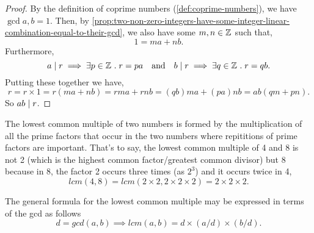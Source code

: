\documentclass[../MathsNotesBase.tex]{subfiles}
\begin{document}
{		
		\bigskip
		\begin{proof}
			By the definition of coprime numbers (\ref{def:coprime-numbers}), we have ${ \operatorname{gcd} a,b = 1 }$. Then, by \autoref{prop:two-non-zero-integers-have-some-integer-linear-combination-equal-to-their-gcd}, we also have some ${ m,n \in \mathbb{Z}^{} }$ such that,
			\[ 1 = ma + nb. \]
			Furthermore,
			\[ a \mid r \implies \exists p \in \mathbb{Z}^{} \;.\; r = pa \hspace{10pt}\text{and}\hspace{10pt} b \mid r \implies \exists q \in \mathbb{Z}^{} \;.\; r = qb. \]
			Putting these together we have,
			\[ r = r \times 1 = r(ma + nb) = rma + rnb = (qb)ma + (pa)nb = ab(qm + pn). \]
			So ${ ab \mid r }$.
		\end{proof}
		
		
		\biggerskip
		\label{sssec:lowest_common_multiple}
		\nl[2]
		The lowest common multiple of two numbers is formed by the multiplication of all the prime factors that occur in the two numbers where repititions of prime factors are important. That's to say, the lowest common multiple of 4 and 8 is not 2 (which is the highest common factor/greatest common divisor) but 8 because in 8, the factor 2 occurs three times (as $2^3$) and it occurs twice in 4,
		\[ lcm(4,8) = lcm(2\times2, 2\times2\times2) = 2\times2\times2. \]
		
		The general formula for the lowest common multiple may be expressed in terms of the gcd as follows
		\[ d = gcd(a, b) \implies lcm(a, b) = d \times (a/d) \times (b/d). \]

	
		\biggerskip
		
		\bigskip
		}
\end{document}
